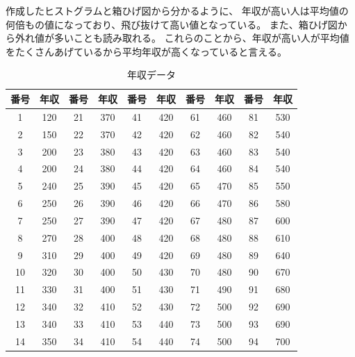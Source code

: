 \documentclass[12pt]{jarticle}
\begin{document}
作成したヒストグラムと箱ひげ図から分かるように、
年収が高い人は平均値の何倍もの値になっており、飛び抜けて高い値となっている。
また、箱ひげ図から外れ値が多いことも読み取れる。
これらのことから、年収が高い人が平均値をたくさんあげているから平均年収が高くなっていると言える。
\clearpage
\begin{table}
    \begin{center}
        \caption{年収データ}
        \begin{tabular}[h!]{|c|c||c|c||c|c||c|c||c|c|}
            \hline
            番号 & 年収 & 番号 & 年収 & 番号 & 年収 & 番号 & 年収 & 番号 & 年収 \\
            \hline
            1    & 120  & 21   & 370  & 41   & 420  & 61   & 460  & 81   & 530  \\
            \hline
            2    & 150  & 22   & 370  & 42   & 420  & 62   & 460  & 82   & 540  \\
            \hline
            3    & 200  & 23   & 380  & 43   & 420  & 63   & 460  & 83   & 540  \\
            \hline
            4    & 200  & 24   & 380  & 44   & 420  & 64   & 460  & 84   & 540  \\
            \hline
            5    & 240  & 25   & 390  & 45   & 420  & 65   & 470  & 85   & 550  \\
            \hline
            6    & 250  & 26   & 390  & 46   & 420  & 66   & 470  & 86   & 580  \\
            \hline
            7    & 250  & 27   & 390  & 47   & 420  & 67   & 480  & 87   & 600  \\
            \hline
            8    & 270  & 28   & 400  & 48   & 420  & 68   & 480  & 88   & 610  \\
            \hline
            9    & 310  & 29   & 400  & 49   & 420  & 69   & 480  & 89   & 640  \\
            \hline
            10   & 320  & 30   & 400  & 50   & 430  & 70   & 480  & 90   & 670  \\
            \hline
            11   & 330  & 31   & 400  & 51   & 430  & 71   & 490  & 91   & 680  \\
            \hline
            12   & 340  & 32   & 410  & 52   & 430  & 72   & 500  & 92   & 690  \\
            \hline
            13   & 340  & 33   & 410  & 53   & 440  & 73   & 500  & 93   & 690  \\
            \hline
            14   & 350  & 34   & 410  & 54   & 440  & 74   & 500  & 94   & 700  \\

\end{tabular}
\end{center}
\end{table}
\end{document}
